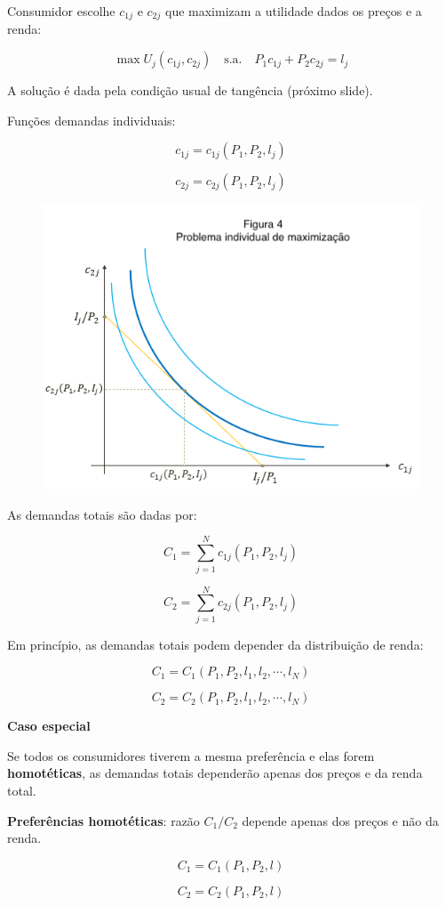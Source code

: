 \documentclass[a4paper,12pt]{article}[abntex2]
\begin{document}
Consumidor escolhe \( c_{1j} \) e \( c_{2j} \) que maximizam a utilidade dados os preços e a renda:

\[
\max U_j(c_{1j}, c_{2j}) \quad \text{s.a.} \quad P_1 c_{1j} + P_2 c_{2j} = l_j
\]

A solução é dada pela condição usual de tangência (próximo slide).

Funções demandas individuais:

\[
c_{1j} = c_{1j}(P_1, P_2, l_j)
\]

\[
c_{2j} = c_{2j}(P_1, P_2, l_j)
\]

\begin{figure}[H]
    \centering
    \includegraphics[width=0.7\linewidth]{Imagens/a9i4.png}
\end{figure}

As demandas totais são dadas por:

\[
C_1 = \sum_{j=1}^{N} c_{1j}(P_1, P_2, l_j)
\]

\[
C_2 = \sum_{j=1}^{N} c_{2j}(P_1, P_2, l_j)
\]

Em princípio, as demandas totais podem depender da distribuição de renda:

\[
C_1 = C_1(P_1, P_2, l_1, l_2, \cdots , l_N)
\]

\[
C_2 = C_2(P_1, P_2, l_1, l_2, \cdots , l_N)
\]

\textbf{Caso especial}  

Se todos os consumidores tiverem a mesma preferência e elas forem \textbf{homotéticas}, as demandas totais dependerão apenas dos preços e da renda total.

\textbf{Preferências homotéticas}: razão \( C_1 / C_2 \) depende apenas dos preços e não da renda.

\[
C_1 = C_1(P_1, P_2, l)
\]

\[
C_2 = C_2(P_1, P_2, l)
\]
\end{document}

